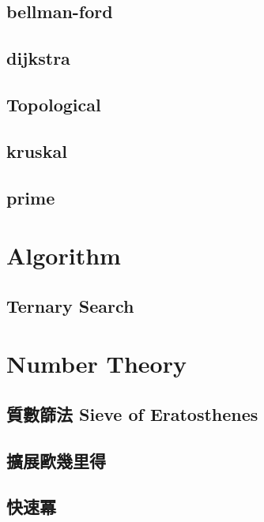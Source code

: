     \subsection{bellman-ford}
        
    \subsection{dijkstra}
        
    \subsection{Topological}
        
    \subsection{kruskal}
        
    \subsection{prime}
        
\section{Algorithm}
    \subsection{Ternary Search}
        
\section{Number Theory}
    \subsection{質數篩法 Sieve of Eratosthenes}
        
    \subsection{擴展歐幾里得}
        
    \subsection{快速冪}
        
